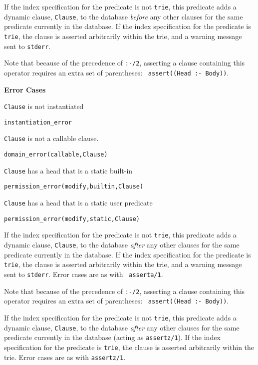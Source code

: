 \begin{description}

%
If the index specification for the predicate is not {\tt trie}, this
predicate adds a dynamic clause, {\tt Clause}, to the database {\em
before} any other clauses for the same predicate currently in the
database.  If the index specification for the predicate is {\tt trie},
the clause is asserted arbitrarily within the trie, and a warning
message sent to {\tt stderr}.

Note that because of the precedence of {\tt :-/2}, asserting a clause
containing this operator requires an extra set of parentheses: {\tt
  assert((Head :- Body))}.

{\bf Error Cases}
\bi
\item 	{\tt Clause} is not instantiated
\bi
\item 	{\tt instantiation\_error}
\ei
%
\item 	{\tt Clause} is not a callable clause.
\bi
\item 	{\tt domain\_error(callable,Clause)}
\ei
%
\item 	{\tt Clause} has a head that is a static built-in
\bi
\item 	{\tt permission\_error(modify,builtin,Clause)}
\ei
\item 	{\tt Clause} has a head that is a static user predicate
\bi
\item 	{\tt permission\_error(modify,static,Clause)}
\ei
%
\ei

%
If the index specification for the predicate is not {\tt trie}, this
predicate adds a dynamic clause, {\tt Clause}, to the database {\em
  after} any other clauses for the same predicate currently in the
database.  If the index specification for the predicate is {\tt trie},
the clause is asserted arbitrarily within the trie, and a warning
message sent to {\tt stderr}.  Error cases are as with {\tt
  asserta/1}.

Note that because of the precedence of {\tt :-/2}, asserting a clause
containing this operator requires an extra set of parentheses: {\tt
  assert((Head :- Body))}.

%
If the index specification for the predicate is not {\tt trie}, this
predicate adds a dynamic clause, {\tt Clause}, to the database {\em
  after} any other clauses for the same predicate currently in the
database (acting as {\tt assertz/1}).  If the index specification for
the predicate is {\tt trie}, the clause is asserted arbitrarily within
the trie.  Error cases are as with {\tt assertz/1}.


\end{description}
